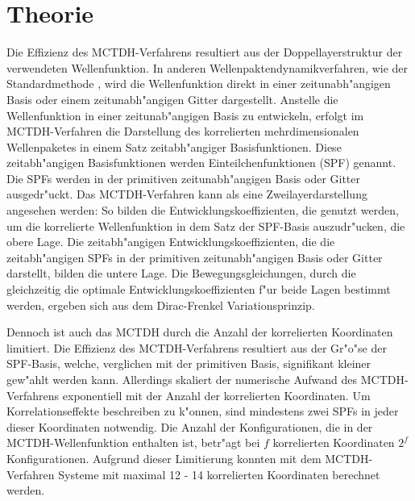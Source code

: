 \chapter{Theorie}


 Die Effizienz des MCTDH-Verfahrens resultiert aus der Doppellayerstruktur der verwendeten Wellenfunktion. In anderen Wellenpaktendynamikverfahren, 
wie der Standardmethode \cite{MCTDHreview3}, wird die Wellenfunktion direkt in einer zeitunabh"angigen Basis oder einem zeitunabh"angigen Gitter dargestellt. 
Anstelle die Wellenfunktion in einer zeitunab"angigen Basis zu entwickeln,
erfolgt im MCTDH-Verfahren die Darstellung des korrelierten mehrdimensionalen Wellenpaketes in einem Satz zeitabh"angiger Basisfunktionen.
Diese zeitabh"angigen Basisfunktionen werden Einteilchenfunktionen (SPF) genannt. Die SPFs werden in der primitiven zeitunabh"angigen Basis oder Gitter ausgedr"uckt.
Das MCTDH-Verfahren kann als eine Zweilayerdarstellung angesehen werden:
So bilden die Entwicklungskoeffizienten, die genutzt werden, um die korrelierte Wellenfunktion in dem Satz der SPF-Basis auszudr"ucken, die obere Lage.
Die zeitabh"angigen Entwicklungskoeffizienten, die die zeitabh"angigen SPFs in der primitiven zeitunabh"angigen Basis oder Gitter darstellt, bilden die untere Lage.
Die Bewegungsgleichungen, durch die gleichzeitig die optimale Entwicklungskoeffizienten f"ur beide Lagen bestimmt werden, ergeben sich aus dem Dirac-Frenkel Variationsprinzip.
   
Dennoch ist auch das MCTDH durch die Anzahl der korrelierten Koordinaten limitiert. 
Die Effizienz des MCTDH-Verfahrens resultiert aus der Gr"o"se der SPF-Basis, welche, verglichen mit der primitiven Basis, signifikant kleiner gew"ahlt werden kann.
Aller\-dings skaliert der numerische Aufwand des MCTDH-Verfahrens exponentiell mit der Anzahl der kor\-relierten Koordinaten.
Um Korrelationseffekte beschreiben zu k"onnen, sind mindestens zwei SPFs in jeder dieser Koordinaten notwendig.
Die Anzahl der Konfigurationen, die in der MCTDH-Wellenfunktion enthalten ist, betr"agt bei $ f $ korrelierten Koordinaten $ 2^f $ Konfigurationen.
Aufgrund dieser Limitierung konnten mit dem MCTDH-Verfahren Systeme mit maximal 12 - 14 korrelierten Koordinaten  berechnet werden.\cite{HM1, HM2, HM4, WWM, WWM2, HM5,
 WMC, BWHHM}
 
